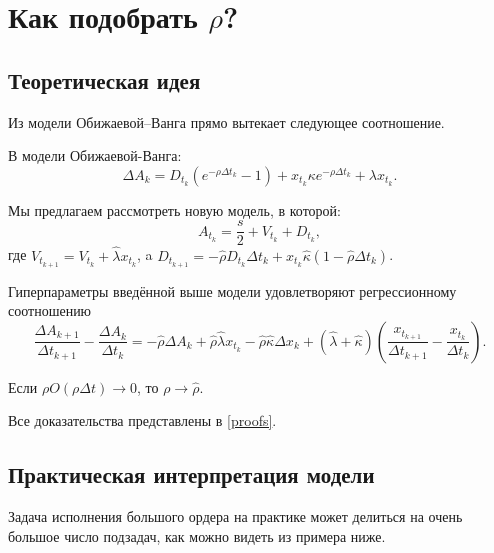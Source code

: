 \section{Как подобрать $\rho$?}
\subsection{Теоретическая идея}

Из модели Обижаевой--Ванга прямо вытекает следующее соотношение.
\begin{lemma}
    В модели Обижаевой-Ванга:
    \begin{equation*}
        \Delta A_k = D_{t_k} (e^{- \rho \Delta t_k} - 1) + x_{t_k} \kappa e^{- \rho \Delta t_k} + \lambda x_{t_k} .
    \end{equation*}
\end{lemma}

Мы предлагаем рассмотреть новую модель, в которой:
\begin{equation*}
        A_{t_k} = \frac{s}{2} + V_{t_k} + D_{t_k},
\end{equation*}
где $V_{t_{k+1}} = V_{t_k} + \hat \lambda x_{t_k}$, a 
$D_{t_{k+1}} = - \hat \rho D_{t_k} \Delta t_k + x_{t_k} \hat \kappa (1 - \hat \rho \Delta t_k)$.


\begin{theorem}
    Гиперпараметры введённой выше
    модели удовлетворяют регрессионному соотношению
    \begin{equation}
        \frac{\Delta A_{k+1}}{\Delta t_{k+1}} - \frac{\Delta A_{k}}{\Delta t_{k}} =
        -\hat \rho \Delta A_k + \hat \rho \hat \lambda x_{t_k} - \hat \rho \hat \kappa \Delta x_k
        + (\hat \lambda + \hat \kappa) \left(\frac{x_{t_{k+1}}}{\Delta t_{k+1}} - \frac{x_{t_k}}{\Delta t_{k}}\right).
    \end{equation}
\end{theorem}

\begin{theorem}
    Если $\rho O(\rho \Delta t) \rightarrow 0$, то $\rho \rightarrow \hat \rho$.
\end{theorem}

  Все доказательства представлены в \ref{proofs}.

\subsection{Практическая интерпретация модели}
Задача исполнения большого ордера на практике может делиться 
на очень большое число подзадач, как можно видеть из примера ниже.

